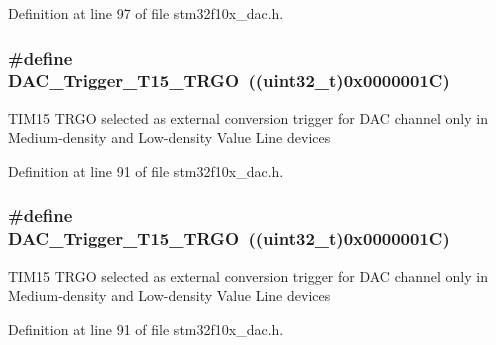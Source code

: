 Definition at line 97 of file stm32f10x\+\_\+dac.\+h.

\subsubsection[{\texorpdfstring{D\+A\+C\+\_\+\+Trigger\+\_\+\+T15\+\_\+\+T\+R\+GO}{DAC_Trigger_T15_TRGO}}]{\setlength{\rightskip}{0pt plus 5cm}\#define D\+A\+C\+\_\+\+Trigger\+\_\+\+T15\+\_\+\+T\+R\+GO~(({\bf uint32\+\_\+t})0x0000001\+C)}\hypertarget{group___d_a_c__trigger__selection_ga9f738c0c1366a588ac4fa9e060278c70}{}\label{group___d_a_c__trigger__selection_ga9f738c0c1366a588ac4fa9e060278c70}
T\+I\+M15 T\+R\+GO selected as external conversion trigger for D\+AC channel only in Medium-\/density and Low-\/density Value Line devices 

Definition at line 91 of file stm32f10x\+\_\+dac.\+h.

\subsubsection[{\texorpdfstring{D\+A\+C\+\_\+\+Trigger\+\_\+\+T15\+\_\+\+T\+R\+GO}{DAC_Trigger_T15_TRGO}}]{\setlength{\rightskip}{0pt plus 5cm}\#define D\+A\+C\+\_\+\+Trigger\+\_\+\+T15\+\_\+\+T\+R\+GO~(({\bf uint32\+\_\+t})0x0000001\+C)}\hypertarget{group___d_a_c__trigger__selection_ga9f738c0c1366a588ac4fa9e060278c70}{}\label{group___d_a_c__trigger__selection_ga9f738c0c1366a588ac4fa9e060278c70}
T\+I\+M15 T\+R\+GO selected as external conversion trigger for D\+AC channel only in Medium-\/density and Low-\/density Value Line devices 

Definition at line 91 of file stm32f10x\+\_\+dac.\+h.

